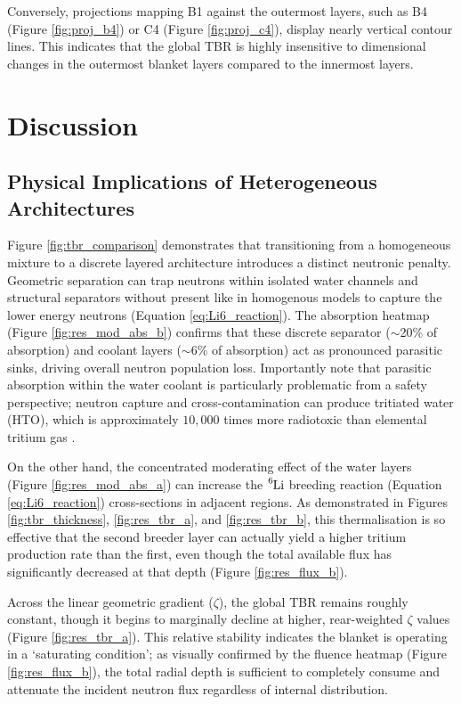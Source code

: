 \documentclass[11pt]{article}
\begin{document}
Conversely, projections mapping B1 against the outermost layers, such as B4 (Figure
\ref{fig:proj_b4}) or C4 (Figure \ref{fig:proj_c4}), display nearly vertical contour lines. This
indicates that the global TBR is highly insensitive to dimensional changes in the outermost blanket
layers compared to the innermost layers.



\section{Discussion}
\subsection{Physical Implications of Heterogeneous Architectures}
\label{sec:discussion_heterogeneous}

Figure \ref{fig:tbr_comparison} demonstrates that transitioning from a homogeneous mixture to a
discrete layered architecture introduces a distinct neutronic penalty. Geometric separation can trap
neutrons within isolated water channels and structural separators without  present like
in homogenous models to capture the lower energy neutrons (Equation \ref{eq:Li6_reaction}). The
absorption heatmap (Figure \ref{fig:res_mod_abs_b}) confirms that these discrete separator
($\sim$20\% of absorption) and coolant layers ($\sim$6\% of absorption) act as pronounced parasitic
sinks, driving overall neutron population loss. Importantly note that parasitic absorption within
the water coolant is particularly problematic from a safety perspective; neutron capture and
cross-contamination can produce tritiated water (HTO), which is approximately $10,000$ times more
radiotoxic than elemental tritium gas \citep{doe_tritium_2015}.

On the other hand, the concentrated moderating effect of the water layers (Figure
\ref{fig:res_mod_abs_a}) can increase the $\ce{^{6}Li}$ breeding reaction (Equation
\ref{eq:Li6_reaction}) cross-sections in adjacent regions. As demonstrated in Figures
\ref{fig:tbr_thickness}, \ref{fig:res_tbr_a}, and \ref{fig:res_tbr_b}, this thermalisation is so
effective that the second breeder layer can actually yield a higher tritium production rate than the
first, even though the total available flux has significantly decreased at that depth (Figure
\ref{fig:res_flux_b}).

Across the linear geometric gradient ($\zeta$), the global TBR remains roughly constant, though it
begins to marginally decline at higher, rear-weighted $\zeta$ values (Figure \ref{fig:res_tbr_a}).
This relative stability indicates the blanket is operating in a `saturating condition'; as visually
confirmed by the fluence heatmap (Figure \ref{fig:res_flux_b}), the total radial depth is sufficient
to completely consume and attenuate the incident neutron flux regardless of internal distribution.
\end{document}
